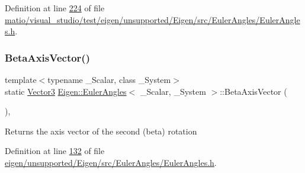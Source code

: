 Definition at line \hyperlink{matio_2visual__studio_2test_2eigen_2unsupported_2_eigen_2src_2_euler_angles_2_euler_angles_8h_source_l00224}{224} of file \hyperlink{matio_2visual__studio_2test_2eigen_2unsupported_2_eigen_2src_2_euler_angles_2_euler_angles_8h_source}{matio/visual\+\_\+studio/test/eigen/unsupported/\+Eigen/src/\+Euler\+Angles/\+Euler\+Angles.\+h}.

\mbox{\label{class_eigen_1_1_euler_angles_aede24ef1ffc5913f2eb6539c1f1b9dc4}} 
\subsubsection{\texorpdfstring{Beta\+Axis\+Vector()}{BetaAxisVector()}\hspace{0.1cm}{\footnotesize\ttfamily [1/2]}}
{\footnotesize\ttfamily template$<$typename \+\_\+\+Scalar, class \+\_\+\+System$>$ \\
static \hyperlink{class_eigen_1_1_euler_angles_af0f446aa0f46b3439abedff63fabf39c}{Vector3} \hyperlink{class_eigen_1_1_euler_angles}{Eigen\+::\+Euler\+Angles}$<$ \+\_\+\+Scalar, \+\_\+\+System $>$\+::Beta\+Axis\+Vector (\begin{DoxyParamCaption}{ }\end{DoxyParamCaption})\hspace{0.3cm}{\ttfamily [inline]}, {\ttfamily [static]}}

\begin{DoxyReturn}{Returns}
the axis vector of the second (beta) rotation 
\end{DoxyReturn}


Definition at line \hyperlink{eigen_2unsupported_2_eigen_2src_2_euler_angles_2_euler_angles_8h_source_l00132}{132} of file \hyperlink{eigen_2unsupported_2_eigen_2src_2_euler_angles_2_euler_angles_8h_source}{eigen/unsupported/\+Eigen/src/\+Euler\+Angles/\+Euler\+Angles.\+h}.

\mbox{\label{class_eigen_1_1_euler_angles_aede24ef1ffc5913f2eb6539c1f1b9dc4}} 
